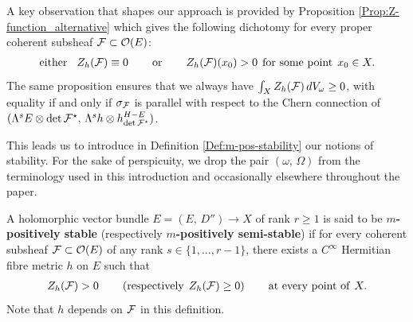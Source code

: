 \documentclass[12pt]{article}
\begin{document}
 A key observation that shapes our approach is provided by Proposition \ref{Prop:Z-function_alternative} which gives the following dichotomy for every proper coherent subsheaf ${\cal F}\subset{\cal O}(E)$: \begin{eqnarray*}\label{eqn:introd_Z-function_alternative}\mbox{either}\hspace{2ex} Z_h({\cal F})\equiv 0 \hspace{5ex}\mbox{or}\hspace{5ex} Z_h({\cal F})(x_0)>0 \hspace{1ex}\mbox{for some point}\hspace{1ex} x_0\in X.\end{eqnarray*} The same proposition ensures that we always have $\int_X Z_h({\cal F})\,dV_\omega \geq 0$, with equality if and only if $\sigma_{{\cal F}}$ is parallel with respect to the Chern connection of $(\Lambda^s E\otimes\det{\cal F}^\star,\,\Lambda^sh\otimes h^{H-E}_{\det{\cal F}^\star})$.

This leads us to introduce in Definition \ref{Def:m-pos-stability} our notions of stability. For the sake of perspicuity, we drop the pair $(\omega,\,\Omega)$ from the terminology used in this introduction and occasionally elsewhere throughout the paper.

A holomorphic vector bundle $E = (E,\,D'')\longrightarrow X$ of rank $r\geq 1$ is said to be {\bf $m$-positively stable} (respectively {\bf $m$-positively semi-stable}) if for every coherent subsheaf ${\cal F}\subset{\cal O}(E)$ of any rank $s\in\{1,\dots , r-1\}$, there exists a $C^\infty$ Hermitian fibre metric $h$ on $E$ such that \begin{eqnarray*} Z_h({\cal F})> 0 \hspace{5ex} (\mbox{respectively} \hspace{1ex} Z_h({\cal F})\geq 0) \hspace{5ex} \mbox{at every point of}\hspace{1ex} X.\end{eqnarray*} Note that $h$ depends on ${\cal F}$ in this definition.
\end{document}
